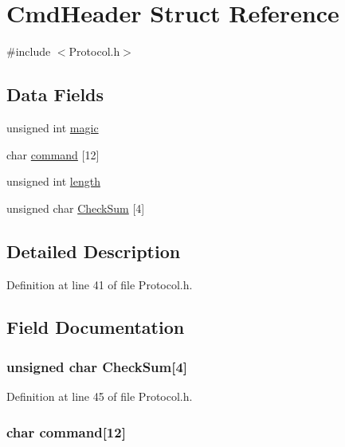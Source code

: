 \hypertarget{struct_cmd_header}{
\section{CmdHeader Struct Reference}
\label{struct_cmd_header}
}


{\ttfamily \#include $<$Protocol.h$>$}

\subsection*{Data Fields}
\begin{DoxyCompactItemize}
\item 
unsigned int \hyperlink{struct_cmd_header_a7154179fe070a40c828f7c03f454d4d6}{magic}
\item 
char \hyperlink{struct_cmd_header_a5b9e40150e73a908b8815ab282e5a4d3}{command} \mbox{[}12\mbox{]}
\item 
unsigned int \hyperlink{struct_cmd_header_ac8d42bcd4a44e078047ccd7291059238}{length}
\item 
unsigned char \hyperlink{struct_cmd_header_ac1222a6e99fed2d4b20d0713ebf83f34}{CheckSum} \mbox{[}4\mbox{]}
\end{DoxyCompactItemize}


\subsection{Detailed Description}


Definition at line 41 of file Protocol.h.



\subsection{Field Documentation}
\hypertarget{struct_cmd_header_ac1222a6e99fed2d4b20d0713ebf83f34}{
\subsubsection[{CheckSum}]{\setlength{\rightskip}{0pt plus 5cm}unsigned char {\bf CheckSum}\mbox{[}4\mbox{]}}}
\label{struct_cmd_header_ac1222a6e99fed2d4b20d0713ebf83f34}


Definition at line 45 of file Protocol.h.

\hypertarget{struct_cmd_header_a5b9e40150e73a908b8815ab282e5a4d3}{
\subsubsection[{command}]{\setlength{\rightskip}{0pt plus 5cm}char {\bf command}\mbox{[}12\mbox{]}}}
\label{struct_cmd_header_a5b9e40150e73a908b8815ab282e5a4d3}


